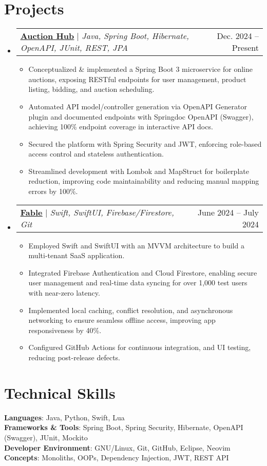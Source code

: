 \documentclass[a4paper,12pt]{article}
\makeatletter
\newcommand{\resumeItem}[1]{
  \item\small{
    {#1 \vspace{-2pt}}
  }
}
\newcommand{\resumeProjectHeading}[2]{
    \item
    \begin{tabular*}{0.97\textwidth}{l@{\extracolsep{\fill}}r}
      \small#1 & #2 \\
    \end{tabular*}\vspace{-7pt}
}
\newcommand{\resumeSubHeadingListStart}{\begin{itemize}[leftmargin=0.15in, label={}]}
\newcommand{\resumeSubHeadingListEnd}{\end{itemize}}
\newcommand{\resumeItemListStart}{\begin{itemize}}
\newcommand{\resumeItemListEnd}{\end{itemize}\vspace{-5pt}}
\makeatother
\begin{document}
\section{Projects}
    \resumeSubHeadingListStart
      \resumeProjectHeading
        {\textbf{\underline{\href{https://github.com/VanshajSaxena/auction-system}{Auction Hub}}} $|$ \emph{Java, Spring Boot, Hibernate, OpenAPI, JUnit, REST, JPA }}{Dec. 2024 -- Present}
          \resumeItemListStart
            \resumeItem{Conceptualized \& implemented a Spring Boot 3 microservice for online auctions, exposing RESTful endpoints for user management, product listing, bidding, and auction scheduling.}
            \resumeItem{Automated API model/controller generation via OpenAPI Generator plugin and documented endpoints with Springdoc OpenAPI (Swagger), achieving 100\% endpoint coverage in interactive API docs. }
            \resumeItem{Secured the platform with Spring Security and JWT, enforcing role-based access control and stateless authentication.}
            \resumeItem{Streamlined development with Lombok and MapStruct for boilerplate reduction, improving code maintainability and reducing manual mapping errors by 100\%.}
          \resumeItemListEnd
      \resumeProjectHeading
      {\textbf{\underline{\href{https://github.com/VanshajSaxena/LMS_User}{Fable}}} $|$ \emph{Swift, SwiftUI, Firebase/Firestore, Git}}{June 2024 -- July 2024}
          \resumeItemListStart
            \resumeItem{Employed Swift and SwiftUI with an MVVM architecture to build a multi-tenant SaaS application.}
            \resumeItem{Integrated Firebase Authentication and Cloud Firestore, enabling secure user management and real-time data syncing for over 1,000 test users with near-zero latency.}
            \resumeItem{Implemented local caching, conflict resolution, and asynchronous networking to ensure seamless offline access, improving app responsiveness by 40\%.}
            \resumeItem{Configured GitHub Actions for continuous integration, and UI testing, reducing post-release defects.}
          \resumeItemListEnd
    \resumeSubHeadingListEnd



%
\section{Technical Skills}
 \begin{itemize}[leftmargin=0.15in, label={}]
    \small{\item{
     \textbf{Languages}{: Java, Python, Swift, Lua} \\
     \textbf{Frameworks \& Tools}{: Spring Boot, Spring Security, Hibernate, OpenAPI (Swagger), JUnit, Mockito} \\
     \textbf{Developer Environment}{: GNU/Linux, Git, GitHub, Eclipse, Neovim} \\
     \textbf{Concepts}{: Monoliths, OOPs, Dependency Injection, JWT, REST API}
    }}
 \end{itemize}


\end{document}
